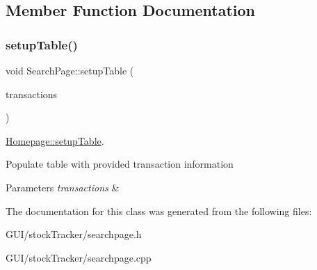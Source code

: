 \subsection{Member Function Documentation}
\mbox{\label{class_search_page_a8024cd843289818a76595fc45e473cb2}} 
\subsubsection{\texorpdfstring{setup\+Table()}{setupTable()}}
{\footnotesize\ttfamily void Search\+Page\+::setup\+Table (\begin{DoxyParamCaption}\item[{std\+::vector$<$ \mbox{\hyperlink{class_transaction_type}{Transaction\+Type}} $>$}]{transactions }\end{DoxyParamCaption})}



\mbox{\hyperlink{class_homepage_a8eeedb7e3e7b6144d7878e9525aad0ab}{Homepage\+::setup\+Table}}. 

Populate table with provided transaction information


\begin{DoxyParams}{Parameters}
{\em transactions} & \\
\hline
\end{DoxyParams}


The documentation for this class was generated from the following files\+:\begin{DoxyCompactItemize}
\item 
G\+U\+I/stock\+Tracker/searchpage.\+h\item 
G\+U\+I/stock\+Tracker/searchpage.\+cpp\end{DoxyCompactItemize}
